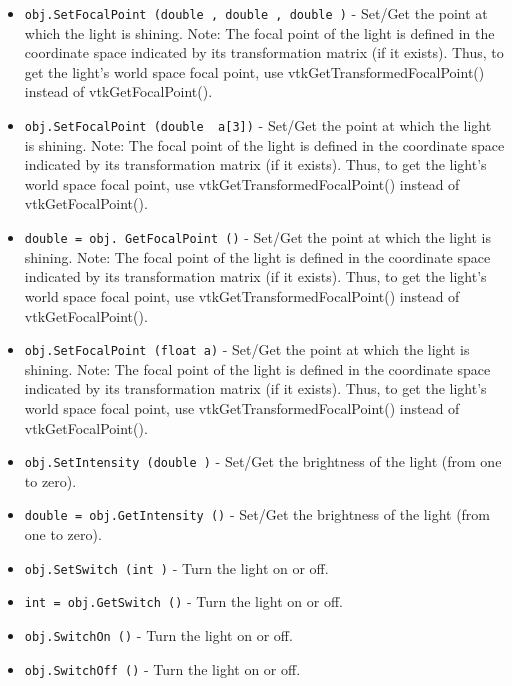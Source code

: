 \begin{itemize}
\item  \verb|obj.SetFocalPoint (double , double , double )| -  Set/Get the point at which the light is shining.
 Note: The focal point of the light is defined in the coordinate
 space indicated by its transformation matrix (if it exists).
 Thus, to get the light's world space focal point, use 
 vtkGetTransformedFocalPoint() instead of vtkGetFocalPoint().

\item  \verb|obj.SetFocalPoint (double  a[3])| -  Set/Get the point at which the light is shining.
 Note: The focal point of the light is defined in the coordinate
 space indicated by its transformation matrix (if it exists).
 Thus, to get the light's world space focal point, use 
 vtkGetTransformedFocalPoint() instead of vtkGetFocalPoint().

\item  \verb|double = obj. GetFocalPoint ()| -  Set/Get the point at which the light is shining.
 Note: The focal point of the light is defined in the coordinate
 space indicated by its transformation matrix (if it exists).
 Thus, to get the light's world space focal point, use 
 vtkGetTransformedFocalPoint() instead of vtkGetFocalPoint().

\item  \verb|obj.SetFocalPoint (float a)| -  Set/Get the point at which the light is shining.
 Note: The focal point of the light is defined in the coordinate
 space indicated by its transformation matrix (if it exists).
 Thus, to get the light's world space focal point, use 
 vtkGetTransformedFocalPoint() instead of vtkGetFocalPoint().

\item  \verb|obj.SetIntensity (double )| -  Set/Get the brightness of the light (from one to zero).

\item  \verb|double = obj.GetIntensity ()| -  Set/Get the brightness of the light (from one to zero).

\item  \verb|obj.SetSwitch (int )| -  Turn the light on or off.

\item  \verb|int = obj.GetSwitch ()| -  Turn the light on or off.

\item  \verb|obj.SwitchOn ()| -  Turn the light on or off.

\item  \verb|obj.SwitchOff ()| -  Turn the light on or off.


\end{itemize}
